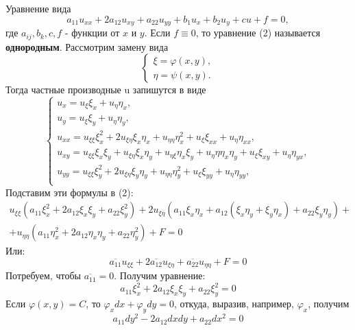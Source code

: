 \documentclass[11pt]{article}
\begin{document}
Уравнение вида
\begin{equation}
a_{11}u_{xx} + 2a_{12}u_{xy} + a_{22}u_{yy} + b_1 u_{x} + b_2 u_y + cu + f = 0,
\end{equation}
где \(a_{ij}, b_k, c, f\) - функции от \(x\) и \(y\).
Если \(f \equiv 0\), то уравнение (2) называется \textbf{однородным}.
Рассмотрим замену вида
\begin{equation*}
\begin{cases}
\xi = \varphi(x, y), \\
\eta = \psi(x, y).
\end{cases}
\end{equation*}
Тогда частные производные u запишутся в виде
\begin{equation*}
\begin{cases}
u_x = u_\xi\xi_x + u_\eta\eta_x, \\
u_y = u_\xi\xi_y + u_\eta\eta_y, \\
u_{xx} = u_{\xi\xi}\xi_x^2 + 2u_{\xi\eta}\xi_x\eta_x + u_{\eta\eta}\eta_x^2 + u_{\xi}\xi_{xx} + u_{\eta}\eta_{xx}, \\
u_{xy} = u_{\xi\xi}\xi_x\xi_y + u_{\xi\eta}\xi_x\eta_y + u_{\eta\xi}\eta_x\xi_y + u_{\eta}{\eta}\eta_x\eta_y + u_{\xi}\xi_{xy} + u_{\eta}\eta_{yx}, \\
u_{yy} = u_{\xi\xi}\xi_y^2 + 2u_{\xi\eta}\xi_y\eta_y + u_{\eta\eta}\eta_y^2 + u_\xi\xi_{yy} + u_\eta\eta_{yy}, \\
\end{cases}
\end{equation*}
Подставим эти формулы в (2):
\begin{multline*}
u_{\xi\xi}\left(a_{11}\xi_x^2 + 2a_{12}\xi_x\xi_y + a_{22}\xi_y^2\right) + 2u_{\xi\eta}\left(a_{11}\xi_x\eta_x + a_{12}(\xi_x\eta_y + \xi_y\eta_x) + a_{22}\xi_y\eta_y\right) + \\
+ u_{\eta\eta}\left(a_{11}\eta_x^2 + 2a_{12}\eta_x\eta_y + a_{22}\eta_y^2\right) + F = 0
\end{multline*}
Или:
\begin{equation}
\overline{a_{11}}u_{\xi\xi} + 2\overline{a_{12}}u_{\xi\eta} + \overline{a_{22}}u_{\eta\eta} + F = 0
\end{equation}
Потребуем, чтобы \(\overline{a_{11}} = 0\). Получим уравнение:
\begin{equation}
a_{11}\xi_x^2 + 2a_{12}\xi_x\xi_y + a_{22}\xi_y^2 = 0
\end{equation}
Если \(\varphi(x, y) = C\), то \(\varphi_xdx + \varphi_ydy = 0\), откуда, выразив, например,
\(\varphi_x\), получим
\begin{equation}
a_{11}dy^2 - 2a_{12}dxdy + a_{22}dx^2 = 0
\end{equation}
\end{document}
